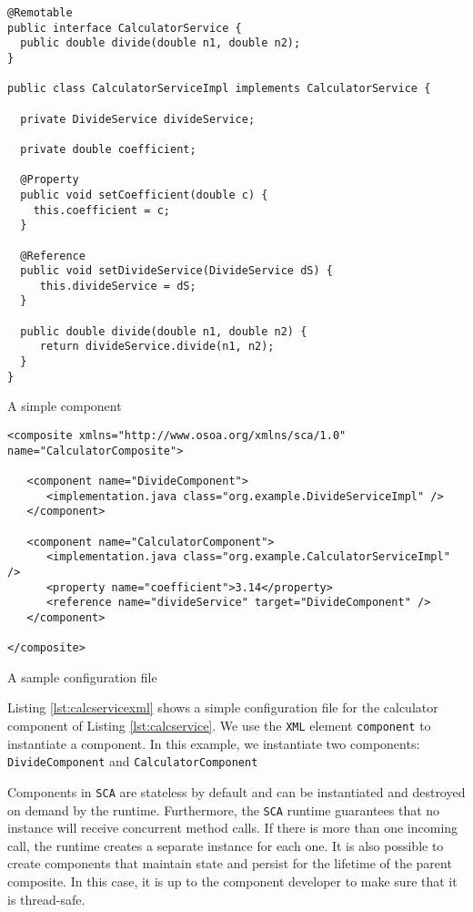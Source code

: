 \begin{listing}
\begin{verbatim}
@Remotable
public interface CalculatorService {
  public double divide(double n1, double n2);
}

public class CalculatorServiceImpl implements CalculatorService {

  private DivideService divideService;
  
  private double coefficient;
  
  @Property
  public void setCoefficient(double c) {
    this.coefficient = c;
  }

  @Reference
  public void setDivideService(DivideService dS) {
     this.divideService = dS;
  }

  public double divide(double n1, double n2) {
     return divideService.divide(n1, n2);
  }
}
\end{verbatim}
\caption{A simple component}
\label{lst:calcservice}
\end{listing}
\begin{listing}
\begin{verbatim}
<composite xmlns="http://www.osoa.org/xmlns/sca/1.0" name="CalculatorComposite">

   <component name="DivideComponent">
      <implementation.java class="org.example.DivideServiceImpl" />
   </component>

   <component name="CalculatorComponent">
      <implementation.java class="org.example.CalculatorServiceImpl" />
      <property name="coefficient">3.14</property>
      <reference name="divideService" target="DivideComponent" />
   </component>

</composite>
\end{verbatim}
\caption{A sample configuration file}
\label{lst:calcservicexml}
\end{listing}

Listing \ref{lst:calcservicexml} shows a simple configuration file for the calculator component of Listing \ref{lst:calcservice}.
We use the \texttt{XML} element \texttt{component} to instantiate a component. In this example, we instantiate two components:
\texttt{DivideComponent} and \texttt{CalculatorComponent}

Components in \texttt{SCA} are stateless by default and can be instantiated and destroyed on demand by the runtime. Furthermore, the
\texttt{SCA} runtime guarantees that no instance will receive concurrent method calls. If there is more than one incoming call, the
runtime creates a separate instance for each one. It is also possible to create components that maintain state and persist
for the lifetime of the parent composite. In this case, it is up to the component developer to make sure that it is thread-safe.

